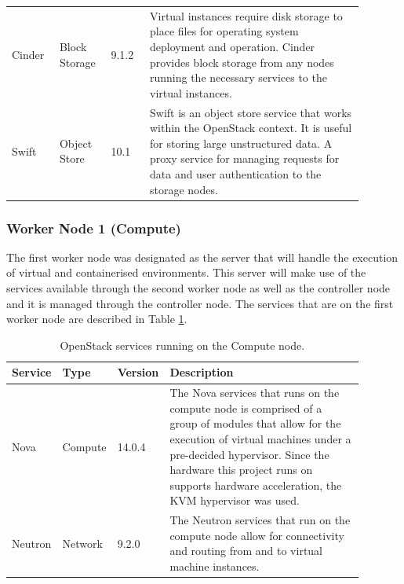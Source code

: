 \begin{longtable}[c]{@{}p{0.12\linewidth}p{0.12\linewidth}p{0.1\linewidth}p{0.55\linewidth}@{}}
Cinder   & Block Storage & 9.1.2   & Virtual instances require disk storage to place files for operating system deployment and operation. Cinder provides block storage from any nodes running the necessary services to the virtual instances.                                                                                              \\
Swift    & Object Store  & 10.1    & Swift is an object store service that works within the OpenStack context. It is useful for storing large unstructured data. A proxy service for managing requests for data and user authentication to the storage nodes.                                                                                \\* \bottomrule
\end{longtable}

\subsubsection{Worker Node 1 (Compute)}

The first worker node was designated as the server that will handle the execution of virtual and containerised environments. This server will make use of the services available through the second worker node as well as the controller node and it is managed through the controller node. The services that are on the first worker node are described in Table \ref{tab:openstack_worker1_services}.

\begin{longtable}[c]{@{}p{0.12\linewidth}p{0.12\linewidth}p{0.1\linewidth}p{0.55\linewidth}@{}}
\caption[OpenStack Compute Node Service List]{OpenStack services running on the Compute node.}
\label{tab:openstack_worker1_services}\\
\toprule
Service & Type    & Version & Description                                                                                                                                                                                                               
 \\* \midrule
\endhead
%
Nova    & Compute & 14.0.4  & The Nova services that runs on the compute node is comprised of a group of modules that allow for the execution of virtual machines under a pre-decided hypervisor. Since the hardware this project runs on supports hardware acceleration, the KVM hypervisor was used.                                                                                           \\
Neutron & Network & 9.2.0   & The Neutron services that run on the compute node allow for connectivity and routing from and to virtual machine instances. \\*
\bottomrule
\end{longtable}

